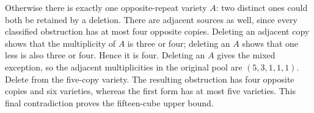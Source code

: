 Otherwise there is exactly one opposite-repeat variety $A$: two distinct
ones could both be retained by a deletion. There are adjacent sources as
well, since every classified obstruction has at most four opposite copies.
Deleting an adjacent copy shows that the multiplicity of $A$ is three or
four; deleting an $A$ shows that one less is also three or four. Hence it
is four. Deleting an $A$ gives the mixed exception, so the adjacent
multiplicities in the original pool are $(5,3,1,1,1)$. Delete from the
five-copy variety. The resulting obstruction has four opposite copies
and six varieties, whereas the first form has at most five varieties.
This final contradiction proves the fifteen-cube upper bound.
